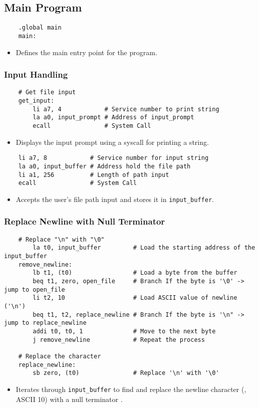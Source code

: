 \documentclass{article}
\begin{document}
\subsection{Main Program}
\begin{verbatim}
    .global main
    main:
\end{verbatim}
\begin{itemize}
    \item Defines the main entry point for the program.
\end{itemize}
\subsubsection{Input Handling}
\begin{verbatim}
    # Get file input
    get_input:
        li a7, 4            # Service number to print string
        la a0, input_prompt # Address of input_prompt
        ecall               # System Call
\end{verbatim}
\begin{itemize}
    \item Displays the input prompt using a syscall for printing a string.
\end{itemize}
\begin{verbatim}
    li a7, 8            # Service number for input string
    la a0, input_buffer # Address hold the file path   
    li a1, 256          # Length of path input	
    ecall               # System Call
\end{verbatim}
\begin{itemize}
    \item Accepts the user's file path input and stores it in \texttt{input_buffer}. 
\end{itemize}
\subsubsection{Replace Newline with Null Terminator}
\begin{verbatim}
    # Replace "\n" with "\0"
        la t0, input_buffer         # Load the starting address of the input_buffer 
    remove_newline:		
        lb t1, (t0)                 # Load a byte from the buffer
        beq t1, zero, open_file     # Branch If the byte is '\0' -> jump to open_file
        li t2, 10                   # Load ASCII value of newline ('\n')
        beq t1, t2, replace_newline # Branch If the byte is '\n" -> jump to replace_newline
        addi t0, t0, 1              # Move to the next byte
        j remove_newline            # Repeat the process

    # Replace the character
    replace_newline:
        sb zero, (t0)               # Replace '\n' with '\0'
\end{verbatim}
\begin{itemize}
    \item Iterates through \texttt{input_buffer} to find and replace the newline character (\texttt{\n}, ASCII 10) with a null terminator \texttt{\0}.
\end{itemize}
\end{document}
